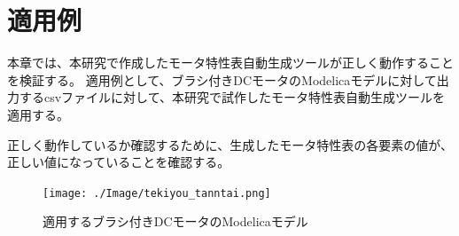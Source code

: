 \chapter{適用例}\label{cha:Indication}


本章では、本研究で作成したモータ特性表自動生成ツールが正しく動作することを検証する。
適用例として、ブラシ付きDCモータのModelicaモデルに対して出力するcsvファイルに対して、本研究で試作したモータ特性表自動生成ツールを適用する。

正しく動作しているか確認するために、生成したモータ特性表の各要素の値が、正しい値になっていることを確認する。


\begin{figure}[t]
	\centering
	\texttt{[image: ./Image/tekiyou\_tanntai.png]}
	\caption{適用するブラシ付きDCモータのModelicaモデル}
	\label{fig:tekiyou_tanntai}
\end{figure}

